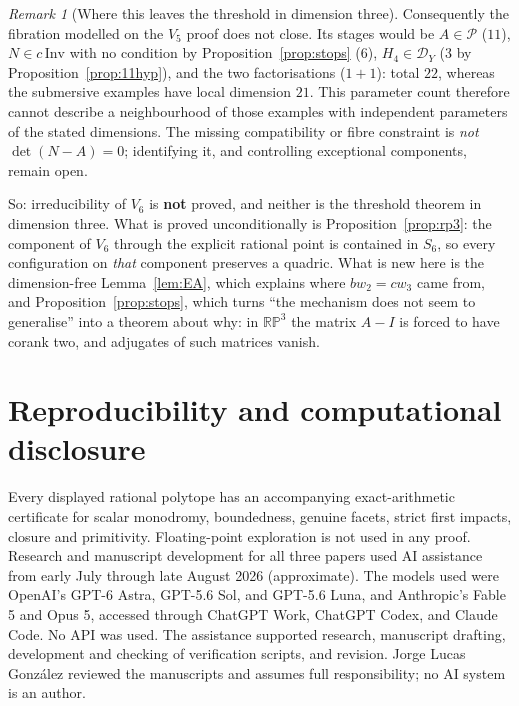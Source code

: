 \documentclass[11pt,a4paper]{article}
\theoremstyle{plain}
\theoremstyle{definition}
\theoremstyle{remark}
\newtheorem{remark}[theorem]{Remark}
\begin{document}
\begin{remark}[Where this leaves the threshold in dimension three]\label{rem:whereleft}
Consequently the fibration modelled on the $V_5$ proof does not close. Its stages
would be $A\in\mathcal P$ ($11$), $N\in c\,\mathrm{Inv}$ with no condition by
Proposition~\ref{prop:stops} ($6$), $H_4\in\mathcal D_Y$ ($3$ by
Proposition~\ref{prop:11hyp}), and the two factorisations ($1+1$): total $22$,
whereas the submersive examples have local dimension $21$. This parameter
count therefore cannot describe a neighbourhood of those examples with
independent parameters of the stated dimensions. The missing compatibility
or fibre constraint is \emph{not} $\det(N-A)=0$; identifying it, and controlling
exceptional components, remain open.

So: irreducibility of $V_6$ is \textbf{not} proved, and neither is the threshold
theorem in dimension three. What is proved unconditionally is
Proposition~\ref{prop:rp3}: the component of $V_6$ through the explicit rational
point is contained in $S_6$, so every configuration on \emph{that} component
preserves a quadric. What is new here is the dimension-free
Lemma~\ref{lem:EA}, which explains where $bw_2=cw_3$ came from, and
Proposition~\ref{prop:stops}, which turns ``the mechanism does not seem to
generalise'' into a theorem about why: in $\mathbb{RP}^3$ the matrix $A-I$ is forced
to have corank two, and adjugates of such matrices vanish.
\end{remark}
\section*{Reproducibility and computational disclosure}
Every displayed rational polytope has an accompanying exact-arithmetic certificate
for scalar monodromy, boundedness, genuine facets, strict first impacts, closure and
primitivity. Floating-point exploration is not used in any proof. Research and manuscript development for all three papers used AI assistance from early
July through late August 2026 (approximate). The models used were OpenAI's GPT-6 Astra,
GPT-5.6 Sol, and GPT-5.6 Luna, and Anthropic's Fable 5 and Opus 5, accessed through
ChatGPT Work, ChatGPT Codex, and Claude Code. No API was used. The assistance supported
research, manuscript drafting, development and checking of verification scripts, and revision.
Jorge Lucas Gonz\'alez reviewed the manuscripts and assumes full responsibility; no AI
system is an author.
\end{document}

